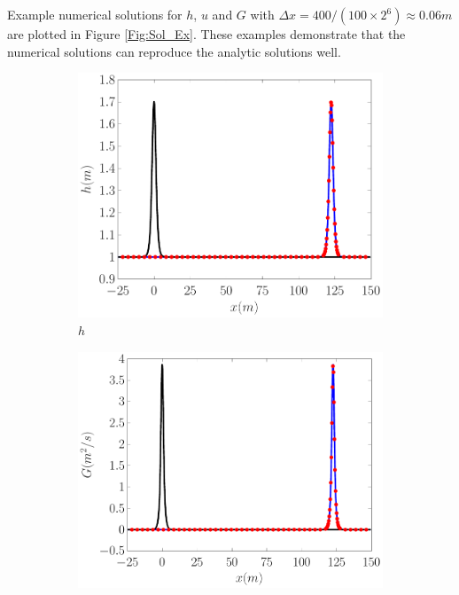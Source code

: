 \documentclass[10pt]{elsarticle}
\begin{document}
Example numerical solutions for $h$, $u$ and $G$ with $\Delta x = 400 / (100 \times 2^{6}) \approx 0.06m$ are plotted in Figure \ref{Fig:Sol_Ex}. These examples demonstrate that the numerical solutions can reproduce the analytic solutions well.
%
\begin{figure}
	\centering
	\begin{subfigure}{0.32\textwidth}
		\centering
		\includegraphics[width=\textwidth]{Figure-2a.pdf}
		\caption{$h$}
	\end{subfigure}
	\begin{subfigure}{0.32\textwidth}
		\centering
		\includegraphics[width=\textwidth]{Figure-2b.pdf}

\end{subfigure}
\end{figure}
\end{document}
